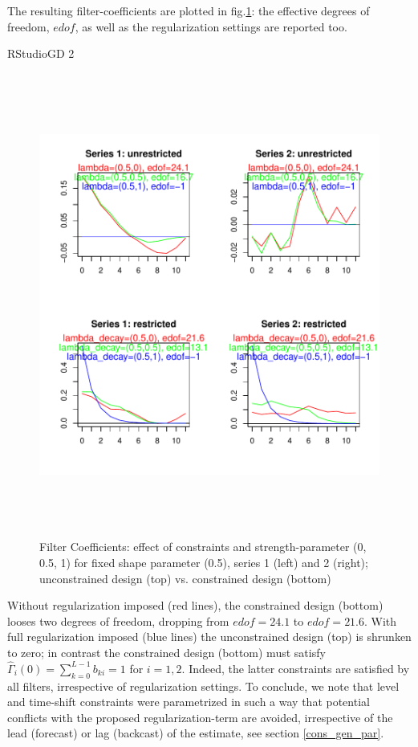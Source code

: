 \documentclass[a4paper]{book}
\begin{document}
The resulting filter-coefficients  are plotted in fig.\ref{z_mdfa_ms_reg_decay_screen_decay_2_rest}: the effective degrees of freedom, $edof$, as well as the regularization settings are reported too.
\begin{Schunk}
\begin{Soutput}
RStudioGD 
        2 
\end{Soutput}
\end{Schunk}
\begin{figure}[H]\begin{center}\includegraphics[height=6in, width=6in]{z_mdfa_ms_reg_decay_screen_decay_2_rest}\caption{Filter Coefficients: effect of constraints and strength-parameter (0, 0.5, 1) for fixed shape parameter (0.5), series 1 (left) and 2 (right); unconstrained design (top) vs. constrained design (bottom)\label{z_mdfa_ms_reg_decay_screen_decay_2_rest}}\end{center}\end{figure}Without regularization imposed (red lines), the constrained design (bottom) looses two degrees of freedom, dropping from $edof=24.1$ to $edof=21.6$. With full regularization imposed (blue lines) the unconstrained design (top) is shrunken to zero; in contrast the constrained design (bottom) must satisfy $\hat{\Gamma}_i(0)=\sum_{k=0}^{L-1}b_{ki}=1$ for $i=1,2$. Indeed, the latter constraints are satisfied by all filters, irrespective of regularization settings. To conclude, we note that level and time-shift constraints were parametrized in such a way that potential conflicts with the proposed regularization-term are avoided, irrespective of the lead (forecast) or lag (backcast) of the estimate, see section \ref{cons_gen_par}.
\end{document}
